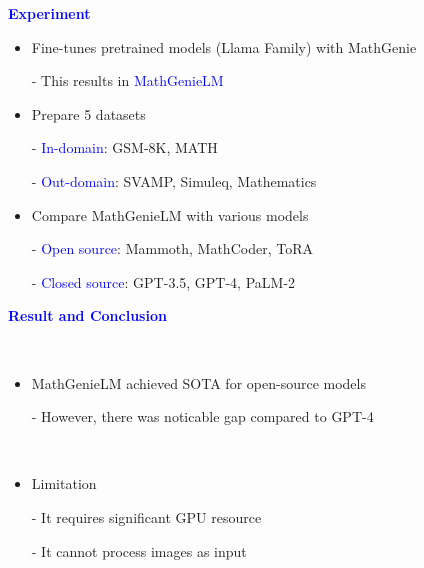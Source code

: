 \documentclass[professionalfont]{beamer}
\begin{document}
\begin{frame}
\begin{center}
    { \textbf{\textcolor{blue}{ {\fontsize{12}{14}\selectfont Experiment} }} }
\end{center}

{\fontsize{10}{14}\selectfont 
\begin{itemize}
    \item Fine-tunes pretrained models (Llama Family) with MathGenie

    - This results in {\textcolor{blue}{MathGenieLM}}
\end{itemize}

\begin{itemize}
    \item Prepare 5 datasets

    - {\textcolor{blue}{In-domain}}: GSM-8K, MATH

    - {\textcolor{blue}{Out-domain}}: SVAMP, Simuleq, Mathematics
\end{itemize}

\begin{itemize}
    \item Compare MathGenieLM with various models

    - {\textcolor{blue}{Open source}}: Mammoth, MathCoder, ToRA

    - {\textcolor{blue}{Closed source}}: GPT-3.5, GPT-4, PaLM-2
\end{itemize}
}

\end{frame}

\begin{frame}
\begin{center}
    { \textbf{\textcolor{blue}{ {\fontsize{12}{14}\selectfont Result and Conclusion} }} }
\end{center}
\\[0.5cm]

{\fontsize{10}{14}\selectfont 
\begin{itemize}
    \item MathGenieLM achieved SOTA for open-source models
    
    - However, there was noticable gap compared to GPT-4
\end{itemize}
\\[0.5cm]

\begin{itemize}
    \item Limitation
    
    - It requires significant GPU resource
    
    - It cannot process images as input
\end{itemize}
}
\end{frame}
\end{document}
